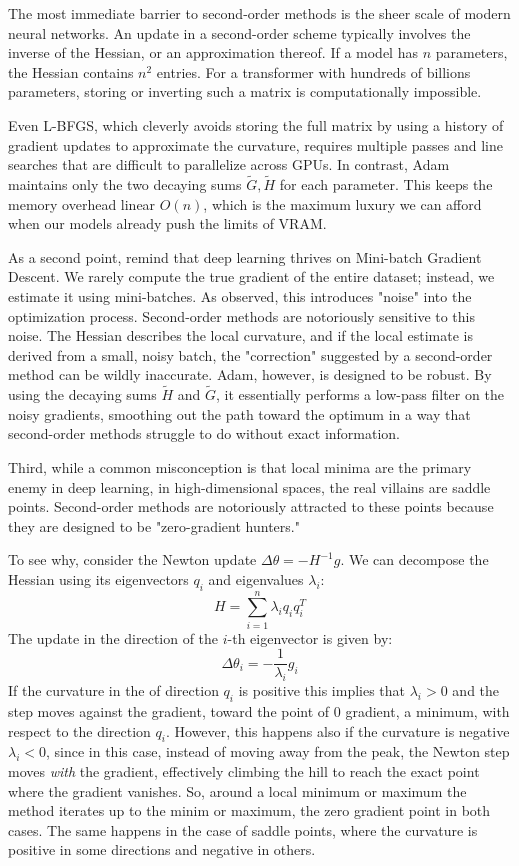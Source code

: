 \medskip
The most immediate barrier to second-order methods is the sheer scale of modern neural networks. An update in a second-order scheme typically involves the inverse of the Hessian, or an approximation thereof. If a model has $n$ parameters, the Hessian contains $n^2$ entries. For a transformer with hundreds of billions parameters, storing or inverting such a matrix is computationally impossible. 

Even L-BFGS, which cleverly avoids storing the full matrix by using a history of gradient updates to approximate the curvature, requires multiple passes and line searches that are difficult to parallelize across GPUs. In contrast, Adam maintains only the two decaying sums $\tilde G, \tilde H$ for each parameter.
This keeps the memory overhead linear $O(n)$, which is the maximum luxury we can afford when our models already push the limits of VRAM.


As a second point, remind that deep learning thrives on Mini-batch Gradient Descent. We rarely compute the true gradient of the entire dataset; instead, we estimate it using mini-batches. As observed, this introduces "noise" into the optimization process. 
Second-order methods are notoriously sensitive to this noise. The Hessian describes the local curvature, and if the local estimate is derived from a small, noisy batch, the "correction" suggested by a second-order method can be wildly inaccurate. Adam, however, is designed to be robust. By using the decaying sums $\tilde H$ and $\tilde G$, it essentially performs a low-pass filter on the noisy gradients, smoothing out the path toward the optimum in a way that second-order methods struggle to do without exact information.

Third, while a common misconception is that local minima are the primary enemy in deep learning, in high-dimensional spaces, the real villains are saddle points. Second-order methods are 
notoriously attracted to these points because they are designed to be "zero-gradient hunters."

To see why, consider the Newton update $\Delta \theta = -H^{-1} g$. We can decompose the Hessian using its eigenvectors $q_i$ and eigenvalues $\lambda_i$:
\begin{equation}
H = \sum_{i=1}^n \lambda_i q_i q_i^T
\end{equation}
The update in the direction of the $i$-th eigenvector is given by:
\begin{equation}
\Delta \theta_i = -\frac{1}{\lambda_i} g_i
\end{equation}
If the curvature in the of direction $q_i$ is positive this implies that $\lambda_i > 0$ and the step moves against the gradient, toward the point of 0 gradient, a minimum, with respect to the direction $q_i$.
However, this happens also if the curvature is negative $\lambda_i < 0$, since in this case, instead of moving away from the peak, the Newton step moves \textit{with} the gradient, effectively climbing the hill to reach the exact point where the gradient vanishes.
So, around a local minimum or maximum the method iterates up to the minim or maximum, the zero gradient point in both cases. The same happens in the case of saddle points, where the curvature is positive in some directions and negative in others. 

